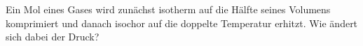 Ein Mol eines Gases wird zunächst isotherm auf die Hälfte seines Volumens komprimiert und danach isochor auf die doppelte Temperatur erhitzt. Wie ändert sich dabei der Druck?
